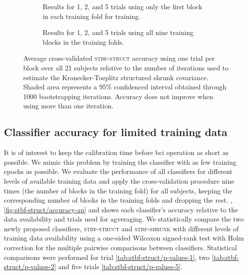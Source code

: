   \begin{figure}
    \sffamily
    \sansmath
    \begin{subfigure}{\linewidth}
      
      \caption{Results for 1, 2, and 5 trials using only the first block in each
      training fold for training.}
    \end{subfigure}
    \smallskip

    \begin{subfigure}{\linewidth}
      
      \caption{Results for 1, 2, and 5 trials using all nine training blocks in
      the training folds.}
    \end{subfigure}
    \caption[Average cross-validated \textsc{stbf-struct} accuracy]{%
      Average cross-validated \textsc{stbf-struct} accuracy using
			one trial per block over all 21 subjects
			relative to the number of iterations used to estimate the Kronecker-Toeplitz structured shrunk
			covariance. Shaded area represents a 95\% confidenced interval obtained
      through 1000 bootstrapping iterations.
      Accuracy does not improve when using more than one iteration.}
		\label{fig:iterations}
	\end{figure}

	\subsection{Classifier accuracy for limited training data}
	It is of interest to keep the calibration time before \ac{bci}
	operation as short as possible.
	We mimic this problem by training the classifier with as few training epochs as possible.
	We evaluate the performance of all classifiers for different levels of
	available training data and apply the cross-validation procedure nine times (the number of blocks in the training fold) for all subjects, keeping the
	corresponding number of blocks in the training folds and dropping the rest.
  , \cref{fig:stbf-struct/accuracy-ap} and
  shows each classifier's accuracy relative to the data availability and trials
  used for agveraging.
	We statistically compare the two newly proposed classifiers,
	\textsc{stbf-struct} and \textsc{stbf-shrunk} with different levels of training
	data availability using a one-sided Wilcoxon signed-rank test with Holm correction for the multiple pairwise comparisons between classifiers.
	Statistical comparisons were performed for trial
  \cref{tab:stbf-struct/p-values-1}, two \cref{tab:stbf-struct/p-values-2}
  and five trials \cref{tab:stbf-struct/p-values-5}.

